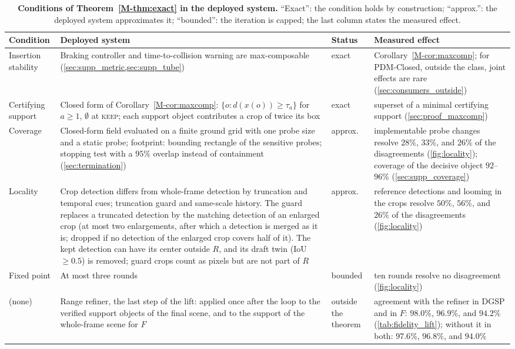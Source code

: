\documentclass[10pt,letterpaper]{article}
\renewcommand{\arraystretch}{1.08}
\newcommand{\method}{DGSP\xspace}
\newcommand{\full}{F}
\newcommand{\dem}{d}
\theoremstyle{remark}
\theoremstyle{plain}
\theoremstyle{definition}
\newcommand{\mrefnum}[1]{\ref*{M-#1}}
\begin{document}
\begin{table}[!htbp]
\centering
\caption{\textbf{Conditions of Theorem~\mrefnum{thm:exact} in the deployed system.} ``Exact'': the condition holds by construction; ``approx.'': the deployed system approximates it; ``bounded'': the iteration is capped; the last column states the measured effect.}
\label{tab:practice}
\small
\renewcommand{\arraystretch}{1.15}
\begin{tabular}{@{}p{2.4cm}p{6.1cm}p{1.1cm}p{5.2cm}@{}}
\toprule
Condition & Deployed system & Status & Measured effect \\
\midrule
Insertion stability & Braking controller and time-to-collision warning are max-composable (\cref{sec:supp_metric,sec:supp_tube}) & exact & Corollary~\mrefnum{cor:maxcomp}; for PDM-Closed, outside the class, joint effects are rare (\cref{sec:consumers_outside}) \\
Certifying support & Closed form of Corollary~\mrefnum{cor:maxcomp}: $\{o:\dem(x(o))\ge\tau_a\}$ for $a\ge1$, $\emptyset$ at \textsc{keep}; each support object contributes a crop of twice its box & exact & superset of a minimal certifying support (\cref{sec:proof_maxcomp}) \\
Coverage & Closed-form field evaluated on a finite ground grid with one probe size and a static probe; footprint: bounding rectangle of the sensitive probes; stopping test with a $95\%$ overlap instead of containment (\cref{sec:termination}) & approx. & implementable probe changes resolve $28\%$, $33\%$, and $26\%$ of the disagreements (\cref{fig:locality}); coverage of the decisive object $92$--$96\%$ (\cref{sec:supp_coverage}) \\
Locality & Crop detection differs from whole-frame detection by truncation and temporal cues; truncation guard and same-scale history. The guard replaces a truncated detection by the matching detection of an enlarged crop (at most two enlargements, after which a detection is merged as it is; dropped if no detection of the enlarged crop covers half of it). The kept detection can have its center outside $R$, and its draft twin (IoU $\ge0.5$) is removed; guard crops count as pixels but are not part of $R$ & approx. & reference detections and looming in the crops resolve $50\%$, $56\%$, and $26\%$ of the disagreements (\cref{fig:locality}) \\
Fixed point & At most three rounds & bounded & ten rounds resolve no disagreement (\cref{fig:locality}) \\
\midrule
(none) & Range refiner, the last step of the lift: applied once after the loop to the verified support objects of the final scene, and to the support of the whole-frame scene for $\full$ & outside the theorem & agreement with the refiner in \method and in $\full$: $98.0\%$, $96.9\%$, and $94.2\%$ (\cref{tab:fidelity_lift}); without it in both: $97.6\%$, $96.8\%$, and $94.0\%$ \\
\bottomrule
\end{tabular}
\end{table}
\end{document}
